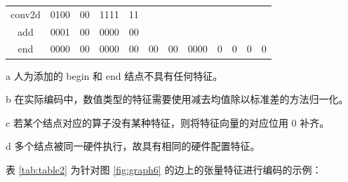 \begin{table}[]
\begin{threeparttable}
{\begin{tabular}{|cccccccccccc|}
            \multicolumn{1}{|c|}{conv2d}                & \multicolumn{1}{c|}{0100} & \multicolumn{1}{c|}{00}  & \multicolumn{1}{c|}{1111} & \multicolumn{1}{c|}{11} & \multicolumn{1}{c|}{}                    & \multicolumn{1}{c|}{}                    & \multicolumn{1}{c|}{}                      & \multicolumn{1}{c|}{}                   & \multicolumn{1}{c|}{}                   & \multicolumn{1}{c|}{}                   &                    \\ \cline{1-5}
            \multicolumn{1}{|c|}{add}                   & \multicolumn{1}{c|}{0001} & \multicolumn{1}{c|}{00}  & \multicolumn{1}{c|}{0000} & \multicolumn{1}{c|}{00} & \multicolumn{1}{c|}{}                    & \multicolumn{1}{c|}{}                    & \multicolumn{1}{c|}{}                      & \multicolumn{1}{c|}{}                   & \multicolumn{1}{c|}{}                   & \multicolumn{1}{c|}{}                   &                    \\ \hline
            \multicolumn{1}{|c|}{end}                   & \multicolumn{1}{c|}{0000} & \multicolumn{1}{c|}{00}  & \multicolumn{1}{c|}{0000} & \multicolumn{1}{c|}{00} & \multicolumn{1}{c|}{00}                  & \multicolumn{1}{c|}{00}                  & \multicolumn{1}{c|}{0000}                  & \multicolumn{1}{c|}{0}                  & \multicolumn{1}{c|}{0}                  & \multicolumn{1}{c|}{0}                  & 0                  \\ \hline
            \end{tabular}}          
            \begin{tablenotes}
                \footnotesize
                \item[a] 人为添加的 begin 和 end 结点不具有任何特征。
                \item[b] 在实际编码中，数值类型的特征需要使用减去均值除以标准差的方法归一化。
                \item[c] 若某个结点对应的算子没有某种特征，则将特征向量的对应位用 0 补齐。
                \item[d] 多个结点被同一硬件执行，故具有相同的硬件配置特征。
            \end{tablenotes}
        \end{threeparttable}
        \label{tab:table1}
\end{table}    

表 \ref{tab:table2} 为针对图 \ref{fig:graph6} 的边上的张量特征进行编码的示例：
    
